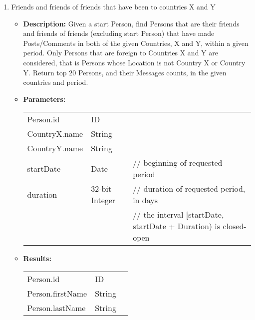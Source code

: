 {\begin{enumerate}
                \item Friends and friends of friends that have been to countries X and Y
                    \begin{itemize}
                        \item \textbf{Description:}
                            Given a start Person, find Persons that are their friends and
                            friends of friends (excluding start Person) that have made
                            Posts/Comments in both of the given Countries, X and Y, within a
                            given period.  Only Persons that are foreign to Countries X and Y
                            are considered, that is Persons whose Location is not Country X or
                            Country Y.  Return top 20 Persons, and their
                            Messages counts,
                            in the given countries and period.  
                        \item \textbf{Parameters:} \\
                            \begin{tabular}{lll}
                                Person.id 										& ID & \\
                                CountryX.name									& String & \\
                                CountryY.name									& String & \\
                                startDate										& Date 	& // beginning of requested period \\
                                duration										& 32-bit Integer 					& // duration of requested period, in days \\
                                                  &                                   & // the interval [startDate, startDate + Duration) is closed-open\\
                            \end{tabular}		
                        \item \textbf{Results:} \\
                            \begin{tabular}{lll}
                                Person.id 										& ID 	& \\
                                Person.firstName 								& String 			& \\
                                Person.lastName 								& String 			& \\

\end{tabular}
\end{itemize}
\end{enumerate}}
